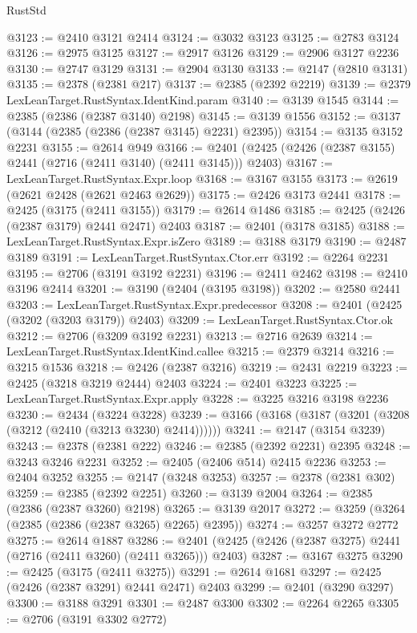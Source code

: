 \begin{lexlean}{RustStd}
\begin{coremodule}
@3123 := @2410 @3121 @2414
@3124 := @3032 @3123
@3125 := @2783 @3124
@3126 := @2975 @3125
@3127 := @2917 @3126
@3129 := @2906 @3127 @2236
@3130 := @2747 @3129
@3131 := @2904 @3130
@3133 := @2147 (@2810 @3131)
@3135 := @2378 (@2381 @217)
@3137 := @2385 (@2392 @2219)
@3139 := @2379 LexLeanTarget.RustSyntax.IdentKind.param
@3140 := @3139 @1545
@3144 := @2385 (@2386 (@2387 @3140) @2198)
@3145 := @3139 @1556
@3152 := @3137 (@3144 (@2385 (@2386 (@2387 @3145) @2231) @2395))
@3154 := @3135 @3152 @2231
@3155 := @2614 @949
@3166 := @2401 (@2425 (@2426 (@2387 @3155) @2441 (@2716 (@2411 @3140) (@2411 @3145))) @2403)
@3167 := LexLeanTarget.RustSyntax.Expr.loop
@3168 := @3167 @3155
@3173 := @2619 (@2621 @2428 (@2621 @2463 @2629))
@3175 := @2426 @3173 @2441
@3178 := @2425 (@3175 (@2411 @3155))
@3179 := @2614 @1486
@3185 := @2425 (@2426 (@2387 @3179) @2441 @2471) @2403
@3187 := @2401 (@3178 @3185)
@3188 := LexLeanTarget.RustSyntax.Expr.isZero
@3189 := @3188 @3179
@3190 := @2487 @3189
@3191 := LexLeanTarget.RustSyntax.Ctor.err
@3192 := @2264 @2231
@3195 := @2706 (@3191 @3192 @2231)
@3196 := @2411 @2462
@3198 := @2410 @3196 @2414
@3201 := @3190 (@2404 (@3195 @3198))
@3202 := @2580 @2441
@3203 := LexLeanTarget.RustSyntax.Expr.predecessor
@3208 := @2401 (@2425 (@3202 (@3203 @3179)) @2403)
@3209 := LexLeanTarget.RustSyntax.Ctor.ok
@3212 := @2706 (@3209 @3192 @2231)
@3213 := @2716 @2639
@3214 := LexLeanTarget.RustSyntax.IdentKind.callee
@3215 := @2379 @3214
@3216 := @3215 @1536
@3218 := @2426 (@2387 @3216)
@3219 := @2431 @2219
@3223 := @2425 (@3218 @3219 @2444) @2403
@3224 := @2401 @3223
@3225 := LexLeanTarget.RustSyntax.Expr.apply
@3228 := @3225 @3216 @3198 @2236
@3230 := @2434 (@3224 @3228)
@3239 := @3166 (@3168 (@3187 (@3201 (@3208 (@3212 (@2410 (@3213 @3230) @2414))))))
@3241 := @2147 (@3154 @3239)
@3243 := @2378 (@2381 @222)
@3246 := @2385 (@2392 @2231) @2395
@3248 := @3243 @3246 @2231
@3252 := @2405 (@2406 @514) @2415 @2236
@3253 := @2404 @3252
@3255 := @2147 (@3248 @3253)
@3257 := @2378 (@2381 @302)
@3259 := @2385 (@2392 @2251)
@3260 := @3139 @2004
@3264 := @2385 (@2386 (@2387 @3260) @2198)
@3265 := @3139 @2017
@3272 := @3259 (@3264 (@2385 (@2386 (@2387 @3265) @2265) @2395))
@3274 := @3257 @3272 @2772
@3275 := @2614 @1887
@3286 := @2401 (@2425 (@2426 (@2387 @3275) @2441 (@2716 (@2411 @3260) (@2411 @3265))) @2403)
@3287 := @3167 @3275
@3290 := @2425 (@3175 (@2411 @3275))
@3291 := @2614 @1681
@3297 := @2425 (@2426 (@2387 @3291) @2441 @2471) @2403
@3299 := @2401 (@3290 @3297)
@3300 := @3188 @3291
@3301 := @2487 @3300
@3302 := @2264 @2265
@3305 := @2706 (@3191 @3302 @2772)

\end{coremodule}
\end{lexlean}
